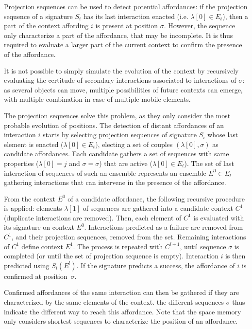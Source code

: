 \documentclass[conference]{IEEEtran}
\begin{document}
Projection sequences can be used to detect potential affordances: if the projection sequence of a signature $S_i$ has its last interaction enacted (i.e. $\lambda[0] \in E_t$), then a part of the context affording $i$ is present at position $\sigma$. However, the sequence only characterize a part of the affordance, that may be incomplete. It is thus required to evaluate a larger part of the current context to confirm the presence of the affordance.

It is not possible to simply simulate the evolution of the context by recursively evaluating the certitude of secondary interactions associated to interactions of $\sigma$: as several objects can move, multiple possibilities of future contexts can emerge, with multiple combination in case of multiple mobile elements.

The projection sequences solve this problem, as they only consider the most probable evolution of positions. The detection of distant affordances of an interaction $i$ starts by selecting projection sequences of signature $S_i$ whose last element is enacted ($\lambda[0] \in E_t$), electing a set of couples $(\lambda[0],\sigma)$ as candidate affordances. Each candidate gathers a set of sequences with same properties ($\lambda[0]=j$ and $\sigma=\sigma$) that are active ($\lambda[0]\in E_t$). The set of last interaction of sequences of such an ensemble represents an ensemble $E^0 \in E_t$ gathering interactions that can intervene in the presence of the affordance.

From the context $E^0$ of a candidate affordance, the following recursive procedure is applied: elements $\lambda[1]$ of sequences are gathered into a candidate context $C^1$ (duplicate interactions are removed). Then, each element of $C^1$ is evaluated with its signature on context $E^0$. Interactions predicted as a failure are removed from $C^1$, and their projection sequences, removed from the set. Remaining interactions of $C^1$ define context $E^1$. The process is repeated with $C^{l+1}$, until sequence $\sigma$ is completed (or until the set of projection sequence is empty). Interaction $i$ is then predicted using $S_i(E^l)$. If the signature predicts a success, the affordance of $i$ is confirmed at position~$\sigma$.

Confirmed affordances of the same interaction can then be gathered if they are characterized by the same elements of the context. the different sequences $\sigma$ thus indicate the different way to reach this affordance. Note that the space memory only considers shortest sequences to characterize the position of an affordance.
\end{document}
